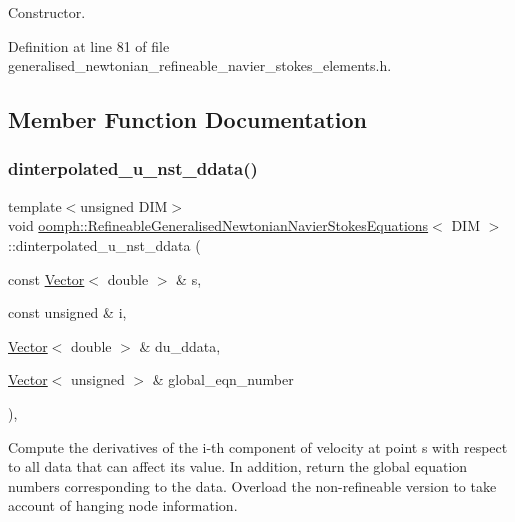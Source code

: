 Constructor. 



Definition at line 81 of file generalised\+\_\+newtonian\+\_\+refineable\+\_\+navier\+\_\+stokes\+\_\+elements.\+h.



\subsection{Member Function Documentation}
\mbox{\label{classoomph_1_1RefineableGeneralisedNewtonianNavierStokesEquations_a00a1486786f3b1782fd7fb19cddf5cf4}} 
\subsubsection{\texorpdfstring{dinterpolated\+\_\+u\+\_\+nst\+\_\+ddata()}{dinterpolated\_u\_nst\_ddata()}}
{\footnotesize\ttfamily template$<$unsigned D\+IM$>$ \\
void \hyperlink{classoomph_1_1RefineableGeneralisedNewtonianNavierStokesEquations}{oomph\+::\+Refineable\+Generalised\+Newtonian\+Navier\+Stokes\+Equations}$<$ D\+IM $>$\+::dinterpolated\+\_\+u\+\_\+nst\+\_\+ddata (\begin{DoxyParamCaption}\item[{const \hyperlink{classoomph_1_1Vector}{Vector}$<$ double $>$ \&}]{s,  }\item[{const unsigned \&}]{i,  }\item[{\hyperlink{classoomph_1_1Vector}{Vector}$<$ double $>$ \&}]{du\+\_\+ddata,  }\item[{\hyperlink{classoomph_1_1Vector}{Vector}$<$ unsigned $>$ \&}]{global\+\_\+eqn\+\_\+number }\end{DoxyParamCaption})\hspace{0.3cm}{\ttfamily [inline]}, {\ttfamily [virtual]}}



Compute the derivatives of the i-\/th component of velocity at point s with respect to all data that can affect its value. In addition, return the global equation numbers corresponding to the data. Overload the non-\/refineable version to take account of hanging node information. 



